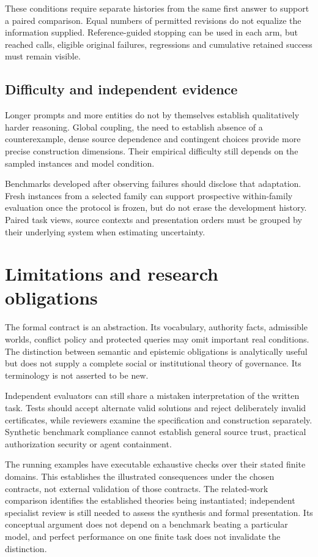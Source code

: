 \documentclass[a4paper,preprint,12pt,numbers,nopreprintline]{elsarticle}
\begin{document}
These conditions require separate histories from the same first answer to support a paired comparison. Equal numbers of permitted revisions do not equalize the information supplied. Reference-guided stopping can be used in each arm, but reached calls, eligible original failures, regressions and cumulative retained success must remain visible.

\subsection{Difficulty and independent evidence}

Longer prompts and more entities do not by themselves establish qualitatively harder reasoning. Global coupling, the need to establish absence of a counterexample, dense source dependence and contingent choices provide more precise construction dimensions. Their empirical difficulty still depends on the sampled instances and model condition.

Benchmarks developed after observing failures should disclose that adaptation. Fresh instances from a selected family can support prospective within-family evaluation once the protocol is frozen, but do not erase the development history. Paired task views, source contexts and presentation orders must be grouped by their underlying system when estimating uncertainty.

\section{Limitations and research obligations}

The formal contract is an abstraction. Its vocabulary, authority facts, admissible worlds, conflict policy and protected queries may omit important real conditions. The distinction between semantic and epistemic obligations is analytically useful but does not supply a complete social or institutional theory of governance. Its terminology is not asserted to be new.

Independent evaluators can still share a mistaken interpretation of the written task. Tests should accept alternate valid solutions and reject deliberately invalid certificates, while reviewers examine the specification and construction separately. Synthetic benchmark compliance cannot establish general source trust, practical authorization security or agent containment.

The running examples have executable exhaustive checks over their stated finite domains. This establishes the illustrated consequences under the chosen contracts, not external validation of those contracts. The related-work comparison identifies the established theories being instantiated; independent specialist review is still needed to assess the synthesis and formal presentation. Its conceptual argument does not depend on a benchmark beating a particular model, and perfect performance on one finite task does not invalidate the distinction.
\end{document}
